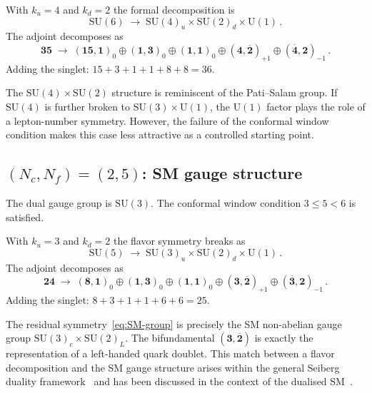 \documentclass[11pt,a4paper]{article}
\newcommand{\Nf}{N_{\!f}}
\newcommand{\Nc}{N_{\!c}}
\newcommand{\rep}[1]{\mathbf{#1}}
\newcommand{\conjrep}[1]{\overline{\mathbf{#1}}}
\begin{document}
With $k_u = 4$ and $k_d = 2$ the formal decomposition is
\begin{equation}
  \mathrm{SU}(6) \;\to\;
  \mathrm{SU}(4)_u \times \mathrm{SU}(2)_d \times \mathrm{U}(1)\,.
\end{equation}
The adjoint decomposes as
\begin{equation}
  \rep{35} \;\to\;
  (\rep{15},\rep{1})_0 \oplus (\rep{1},\rep{3})_0
  \oplus (\rep{1},\rep{1})_0
  \oplus (\rep{4},\conjrep{2})_{+1}
  \oplus (\conjrep{4},\rep{2})_{-1}\,.
  \label{eq:adj-26}
\end{equation}
Adding the singlet: $15 + 3 + 1 + 1 + 8 + 8 = 36$.

The $\mathrm{SU}(4) \times \mathrm{SU}(2)$ structure is
reminiscent of the Pati--Salam group.
If $\mathrm{SU}(4)$ is further broken to
$\mathrm{SU}(3) \times \mathrm{U}(1)$,
the $\mathrm{U}(1)$ factor plays the role of a
lepton-number symmetry.
However, the failure of the conformal window condition makes this
case less attractive as a controlled starting point.

\subsection{$(\Nc,\Nf) = (2,5)$: SM gauge structure}
\label{sec:25}

The dual gauge group is $\mathrm{SU}(3)$.
The conformal window condition $3 \le 5 < 6$ is satisfied.

With $k_u = 3$ and $k_d = 2$ the flavor symmetry breaks as
\begin{equation}
  \mathrm{SU}(5) \;\to\;
  \mathrm{SU}(3)_u \times \mathrm{SU}(2)_d \times \mathrm{U}(1)\,.
  \label{eq:SM-group}
\end{equation}
The adjoint decomposes as
\begin{equation}
  \rep{24} \;\to\;
  (\rep{8},\rep{1})_0 \oplus (\rep{1},\rep{3})_0
  \oplus (\rep{1},\rep{1})_0
  \oplus (\rep{3},\conjrep{2})_{+1}
  \oplus (\conjrep{3},\rep{2})_{-1}\,.
  \label{eq:adj-25}
\end{equation}
Adding the singlet: $8 + 3 + 1 + 1 + 6 + 6 = 25$.

The residual symmetry~\eqref{eq:SM-group} is precisely the SM
non-abelian gauge group $\mathrm{SU}(3)_c \times \mathrm{SU}(2)_L$.
The bifundamental $(\rep{3},\conjrep{2})$ is exactly the
representation of a left-handed quark doublet.
This match between a flavor decomposition and the SM gauge
structure arises within the general Seiberg duality
framework~\cite{Seiberg1995} and has been discussed in the
context of the dualised SM~\cite{CacciapagliaSannino2024}.
\end{document}

